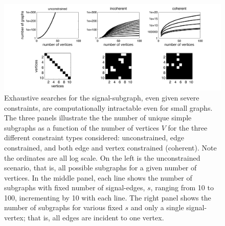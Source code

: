 \documentclass[10pt,journal,cspaper,compsoc]{IEEEtran}
\begin{document}



\begin{figure}[tb!]
	\centering
		\includegraphics[width=1.0\linewidth]{../figs/num_of_graphs.pdf}
	\caption{Exhaustive searches for the signal-subgraph, even given severe constraints, are computationally intractable even for small graphs.  The three panels illustrate the 
	the number of unique simple subgraphs as a function of the number of vertices $V$
	for the three different constraint types considered: unconstrained, edge constrained, and both edge and vertex constrained (coherent).  Note the ordinates are all log scale.   On the left is the unconstrained scenario, that is, all possible subgraphs for a given number of vertices.  In the middle panel, each line shows the number of subgraphs with fixed number of signal-edges, $s$, ranging from 10 to 100, incrementing by 10 with each line.  The right panel shows the number of subgraphs for various fixed $s$ and only a single signal-vertex; that is, all edges are incident to one vertex.  %
	}
	\label{fig:numgraphs}
\end{figure}
\end{document}
